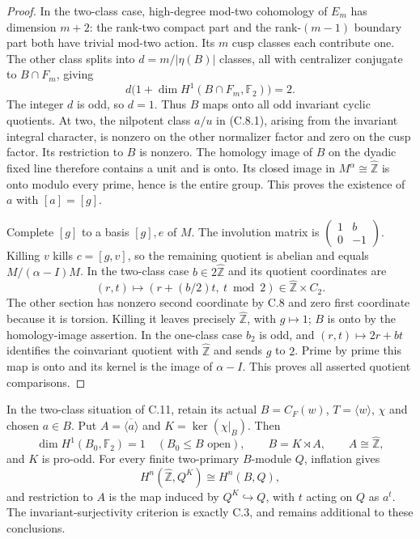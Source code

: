 \begin{proof}
In the two-class case, high-degree mod-two
cohomology of $E_m$ has dimension $m+2$:
the rank-two compact part and the rank-$(m-1)$
boundary part both have trivial mod-two
action.  Its $m$ cusp classes each contribute
one.  The other class splits into
$d=m/|\eta(B)|$ classes, all with centralizer
conjugate to $B\cap F_m$, giving
\[
 d\bigl(1+\dim H^1(B\cap F_m,\mathbb F_2)\bigr)=2.
\]
The integer $d$ is odd, so $d=1$.  Thus $B$
maps onto all odd invariant cyclic quotients.
At two, the nilpotent class $a/u$ in (C.8.1),
arising from the invariant integral character,
is nonzero on the other normalizer factor
and zero on the cusp factor.  Its restriction
to $B$ is nonzero.  The homology image of
$B$ on the dyadic fixed line therefore
contains a unit and is onto.  Its closed
image in $M^\alpha\cong\widehat{\mathbb Z}$
is onto modulo every prime, hence is the
entire group.  This proves the existence
of $a$ with $[a]=[g]$.

Complete $[g]$ to a basis $[g],e$ of $M$.
The involution matrix is
$\left(\begin{smallmatrix}1&b\\0&-1\end{smallmatrix}\right)$.
Killing $v$ kills $c=[g,v]$, so the remaining
quotient is abelian and equals
$M/(\alpha-I)M$.  In the two-class case
$b\in2\widehat{\mathbb Z}$ and its quotient
coordinates are
\[
 (r,t)\longmapsto(r+(b/2)t,\ t\bmod2)
      \in\widehat{\mathbb Z}\times C_2.
\]
The other section has nonzero second coordinate
by C.8 and zero first coordinate because it
is torsion.  Killing it leaves precisely
$\widehat{\mathbb Z}$, with $g\mapsto1$;
$B$ is onto by the homology-image assertion.
In the one-class case $b_2$ is odd, and
$(r,t)\mapsto2r+bt$ identifies the coinvariant
quotient with $\widehat{\mathbb Z}$ and sends
$g$ to $2$.  Prime by prime this map is
onto and its kernel is the image of
$\alpha-I$.  This proves all asserted
quotient comparisons.
\end{proof}

In the two-class situation of C.11, retain its actual
$B=C_F(w)$, $T=\langle w\rangle$, $\chi$ and chosen
$a\in B$.  Put $A=\overline{\langle a\rangle}$ and
$K=\ker(\chi|_B)$.  Then
\[
 \dim H^1(B_0,\mathbb F_2)=1\quad(B_0\leq B\text{ open}),
 \qquad B=K\rtimes A,
 \qquad A\cong\widehat{\mathbb Z},
                                                               \tag{C.12.1}
\]
and $K$ is pro-odd.  For every finite two-primary
$B$-module $Q$, inflation gives
\[
 H^n(\widehat{\mathbb Z},Q^K)\cong H^n(B,Q),                 \tag{C.12.2}
\]
and restriction to $A$ is the map induced by
$Q^K\hookrightarrow Q$, with $t$ acting on $Q$
as $a^t$.  The invariant-surjectivity criterion
is exactly C.3, and remains additional to these
conclusions.

